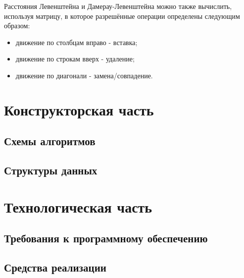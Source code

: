 ﻿\documentclass[12pt]{report}
\begin{document}
	Расстояния Левенштейна и Дамерау-Левенштейна можно также вычислить, используя матрицу, в которое разрешённые операции определены следующим образом:
	\begin{itemize}
		\item движение по столбцам вправо - вставка;
		\item движение по строкам вверх - удаление;
		\item движение по диагонали - замена/совпадение.
	\end{itemize}

	\chapter{Конструкторская часть}

	\section{Схемы алгоритмов}

	\section{Структуры данных}
	
	\chapter{Технологическая часть}
	\section{Требования к программному обеспечению}
	\section{Средства реализации}
\end{document}
